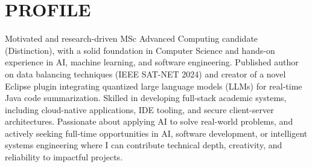\section{PROFILE}
Motivated and research-driven MSc Advanced Computing candidate (Distinction), with a solid foundation in Computer Science and hands-on experience in AI, machine learning, and software engineering. Published author on data balancing techniques (IEEE SAT-NET 2024) and creator of a novel Eclipse plugin integrating quantized large language models (LLMs) for real-time Java code summarization. Skilled in developing full-stack academic systems, including cloud-native applications, IDE tooling, and secure client-server architectures. Passionate about applying AI to solve real-world problems, and actively seeking full-time opportunities in AI, software development, or intelligent systems engineering where I can contribute technical depth, creativity, and reliability to impactful projects.